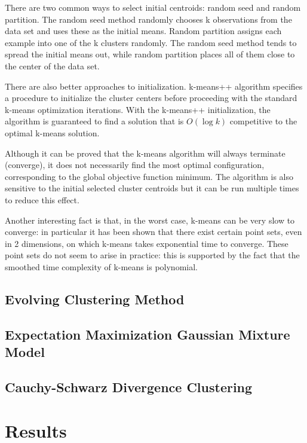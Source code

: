 \documentclass[]{IEEEphot}
\begin{document}
There are two common ways to select initial centroids: random seed and random partition.
The random seed method randomly chooses k observations from the data set
and uses these as the initial means. Random partition
assigns each example into one of the k clusters randomly.
The random seed method tends to spread the initial means out, while random partition
places all of them close to the center of the data set.

There are also better approaches to initialization. k-means++ algorithm specifies a
procedure to initialize the cluster centers before proceeding with the standard k-means
optimization iterations. With the k-means++ initialization, the algorithm is guaranteed
to find a solution that is $O(\log k)$ competitive to the optimal k-means solution.

Although it can be proved that the k-means algorithm will always terminate (converge),
it does not necessarily find the most optimal configuration,
corresponding to the global objective function minimum. The algorithm is also sensitive
to the initial selected cluster centroids but it can be run multiple times to reduce this effect.

Another interesting fact is that, in the worst case, k-means can be very slow to converge:
in particular it has been shown that there exist certain point sets,
even in 2 dimensions, on which k-means takes exponential time to converge.
These point sets do not seem to arise in practice: this is supported by the
fact that the smoothed time complexity of k-means is polynomial.

\subsection{Evolving Clustering Method}

\subsection{Expectation Maximization Gaussian Mixture Model}

\subsection{Cauchy-Schwarz Divergence Clustering}

\section{Results}
\end{document}
